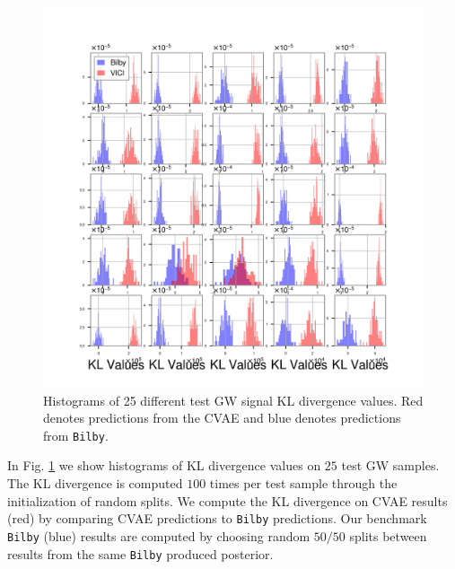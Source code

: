 \documentclass[%
showpacs,
 amsmath,amssymb,
 aps,
 twocolumn,
 prl,
 reprint,
floatfix,
]{revtex4-1}
\begin{document}
%
%
\begin{figure}
    \includegraphics[width=\columnwidth]{images/hist-kl_0.png}
    \caption{\label{fig:kl_results} Histograms of 
    25 different test GW signal KL divergence values. 
    Red denotes predictions from the CVAE and blue 
    denotes predictions from \texttt{Bilby}.}
\end{figure}

In Fig. \ref{fig:kl_results} we show histograms of KL divergence 
values on $25$ test GW samples. The KL divergence is computed 
$100$ times per test sample through the initialization of random splits. We compute 
the KL divergence on CVAE results (red) by comparing CVAE predictions 
to \texttt{Bilby} predictions. Our benchmark \texttt{Bilby} (blue) results are computed by choosing 
random $50/50$ splits between results from the same \texttt{Bilby} produced 
posterior. 
\end{document}
